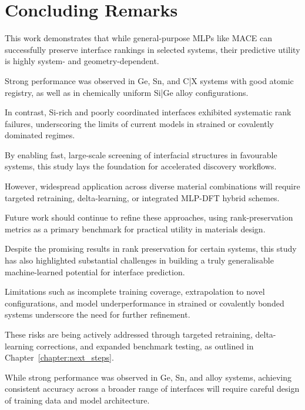 \section{Concluding Remarks} \label{section:concluding_remarks}


This work demonstrates that while general-purpose MLPs like MACE can successfully preserve interface rankings in
selected systems, their predictive utility is highly system- and geometry-dependent.

Strong performance was observed in Ge, Sn, and C|X systems with good atomic registry, as well as in chemically uniform
Si|Ge alloy configurations.

In contrast, Si-rich and poorly coordinated interfaces exhibited systematic rank failures, underscoring the limits of
current models in strained or covalently dominated regimes.


By enabling fast, large-scale screening of interfacial structures in favourable systems, this study lays the foundation
for accelerated discovery workflows.

However, widespread application across diverse material combinations will require targeted retraining, delta-learning,
or integrated MLP-DFT hybrid schemes.

Future work should continue to refine these approaches, using rank-preservation metrics as a primary benchmark for
practical utility in materials design.


Despite the promising results in rank preservation for certain systems, this study has also highlighted substantial
challenges in building a truly generalisable machine-learned potential for interface prediction.

Limitations such as incomplete training coverage, extrapolation to novel configurations, and model underperformance in
strained or covalently bonded systems underscore the need for further refinement.

These risks are being actively addressed through targeted retraining, delta-learning corrections, and expanded benchmark
testing, as outlined in Chapter~\ref{chapter:next_steps}.

While strong performance was observed in Ge, Sn, and alloy systems, achieving consistent accuracy across a broader range
of interfaces will require careful design of training data and model architecture.

